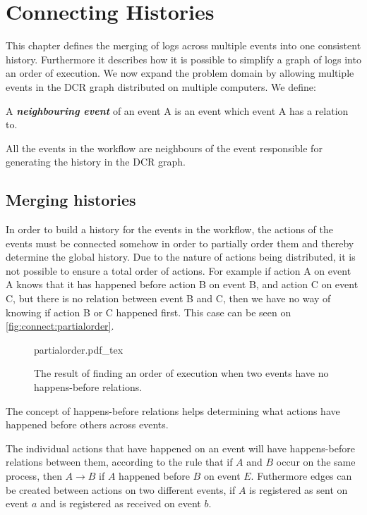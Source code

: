 \chapter{Connecting Histories} %
\label{chap:connecting-histories}
	This chapter defines the merging of logs across multiple events into one consistent history. Furthermore it describes how it is possible to simplify a graph of logs into an order of execution.
	We now expand the problem domain by allowing multiple events in the DCR graph distributed on multiple computers. We define:
	\begin{definition}
		A \textit{\textbf{neighbouring event}} of an event A is an event which event A has a relation to.  
	\end{definition}
	\noindent All the events in the workflow are neighbours of the event responsible for generating the history in the DCR graph.
	
	\section{Merging histories} 
	In order to build a history for the events in the workflow, the actions of the events must be connected somehow in order to partially order them and thereby determine the global history. Due to the nature of actions being distributed, it is not possible to ensure a total order of actions. For example if action A on event A knows that it has happened before action B on event B, and action C on event C, but there is no relation between event B and C, then we have no way of knowing if action B or C happened first. This case can be seen on \autoref{fig:connect:partialorder}.
	
	\begin{figure}
		\centering
		{partialorder.pdf_tex}
		\caption{The result of finding an order of execution when two events have no happens-before relations.}
		\label{fig:connect:partialorder}
	\end{figure}
	
	\newpar The concept of happens-before relations helps determining what actions have happened before others across events. 
	
	The individual actions that have happened on an event will have happens-before relations between them, according to the rule that if $A$ and $B$ occur on the same process, then $A \rightarrow B$ if $A$ happened before $B$ on event $E$. 
	Futhermore edges can be created between actions on two different events, if $A$ is registered as sent on event $a$ and is registered as received on event $b$.
	
